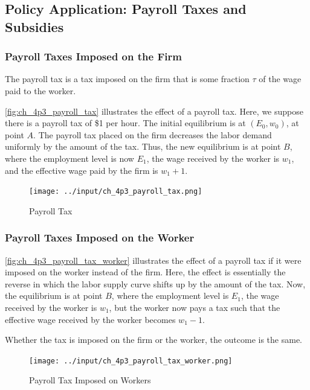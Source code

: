 \subsection{Policy Application: Payroll Taxes and Subsidies}

\subsubsection{Payroll Taxes Imposed on the Firm}

The payroll tax is a tax imposed on the firm 
that is some fraction $\tau$ of the wage paid to
the worker.

\autoref{fig:ch_4p3_payroll_tax}
illustrates the effect of a payroll tax.
Here, we suppose there is a payroll tax of \$1 per hour.
The initial equilibrium is at $(E_0, w_0)$, at point $A$.
The payroll tax placed on the firm decreases
the labor demand uniformly by the amount of the tax.
Thus, the new equilibrium is at point $B$, where 
the employment level is now $E_1$, the wage received 
by the worker is $w_1$, and the effective wage paid by 
the firm is $w_1 + 1$.

\FloatBarrier

\begin{figure}[!htb]
    \centering
        \texttt{[image: ../input/ch\_4p3\_payroll\_tax.png]}
    \caption{Payroll Tax}
    \label{fig:ch_4p3_payroll_tax}
\end{figure}

\FloatBarrier

\subsubsection{Payroll Taxes Imposed on the Worker}

\autoref{fig:ch_4p3_payroll_tax_worker}
illustrates the effect of a payroll tax
if it were imposed on the worker instead of the firm.
Here, the effect is essentially the reverse
in which the labor supply curve shifts up 
by the amount of the tax.
Now, the equilibrium is 
at point $B$, where the employment level is $E_1$,
the wage received by the worker is $w_1$, but 
the worker now pays a tax such that the 
effective wage received by the worker becomes $w_1 - 1$.

Whether the tax is imposed on the firm or the worker,
the outcome is the same.

\FloatBarrier

\begin{figure}[!htb]
    \centering
        \texttt{[image: ../input/ch\_4p3\_payroll\_tax\_worker.png]}
    \caption{Payroll Tax Imposed on Workers}
    \label{fig:ch_4p3_payroll_tax_worker}
\end{figure}

